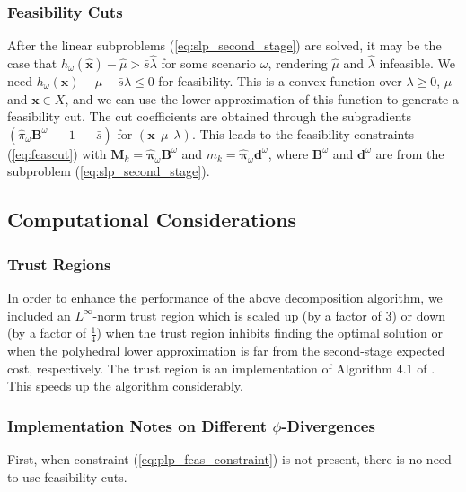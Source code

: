 \documentclass[opre,nonblindrev]{informs3} %
\newcommand{\x}{\mathbf{x}}
\newcommand{\xh}{\hat{\x}}
\newcommand{\lh}{\hat{\lambda}}
\newcommand{\mh}{\hat{\mu}}
\newcommand{\bpi}{\mathbf{\pi}}
\newcommand{\bpih}{\hat{\bpi}}
\newcommand{\B}{\mathbf{B}}
\renewcommand{\d}{\mathbf{d}}
\newcommand{\M}{\mathbf{M}}
\begin{document}
\subsubsection{Feasibility Cuts}
After the linear subproblems (\ref{eq:slp_second_stage}) are solved, it may be the case that $h_\omega(\xh) - \mh > \bar{s} \lh$ for some scenario $\omega$, rendering $\mh$ and $\lh$ infeasible.
We need $h_\omega(\x) - \mu - \bar{s}\lambda \leq 0$ for feasibility. 
This is a convex function over $\lambda \geq 0$, $\mu$ and $\x \in X$, and we can use the lower approximation of this function to generate a feasibility cut. 
The cut coefficients are obtained through the subgradients $(\hat{\pi}_\omega \B^\omega \ \ -1 \ \ -\bar{s} )$ for $(\x\ \ \mu\ \ \lambda)$.  
This leads to the feasibility constraints (\ref{eq:feascut}) with $\M_k = \bpih_\omega \B^\omega$ and $m_k =\bpih_\omega \d^\omega$, where $\B^\omega$ and $\d^\omega$ are from the subproblem (\ref{eq:slp_second_stage}).


\subsection{Computational Considerations}
\label{ssec:computcons}

\subsubsection{Trust Regions}

In order to enhance the performance of the above decomposition algorithm, we included an $L^\infty$-norm trust region which is scaled up (by a factor of $3$) or down (by a factor of $\tfrac{1}{4}$) when the trust region inhibits finding the optimal solution or when the polyhedral lower approximation is far from the second-stage expected cost, respectively.
The trust region is an implementation of Algorithm 4.1 of \cite{nocedal1999numerical}.
This speeds up the algorithm considerably. 

\subsubsection{Implementation Notes on Different $\phi$-Divergences}
\label{ssec:implement}

First, when constraint (\ref{eq:plp_feas_constraint}) is not present, there is no need to use feasibility cuts. 
\end{document}
